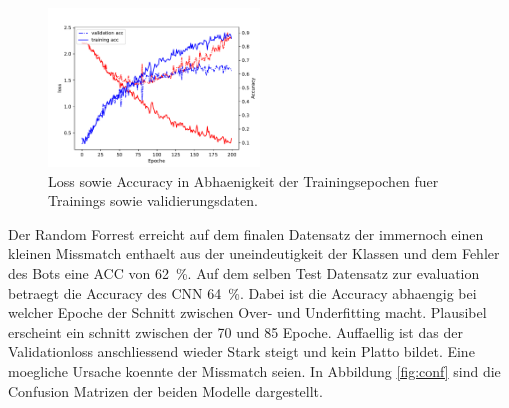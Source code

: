 \begin{figure}
		\centering
		\includegraphics[width=0.5\textwidth]{pictures/train_nn.pdf}
		\caption{Loss sowie Accuracy in Abhaenigkeit der Trainingsepochen fuer
		Trainings sowie validierungsdaten.}
		\label{fig:}
\end{figure}
Der Random Forrest erreicht auf dem finalen Datensatz der immernoch einen
kleinen Missmatch enthaelt aus der uneindeutigkeit der Klassen und dem Fehler
des Bots eine ACC von \SI{62}{\percent}. 
Auf dem selben Test Datensatz zur evaluation betraegt die Accuracy des CNN
\SI{64}{\percent}.
Dabei ist die Accuracy abhaengig bei welcher Epoche der Schnitt zwischen Over-
und Underfitting macht.
Plausibel erscheint ein schnitt zwischen der \num{70} und \num{85} Epoche.
Auffaellig ist das der Validationloss anschliessend wieder Stark steigt und kein
Platto bildet.
Eine moegliche Ursache koennte der Missmatch seien.
In Abbildung \ref{fig:conf} sind die Confusion Matrizen der beiden Modelle
dargestellt. 
